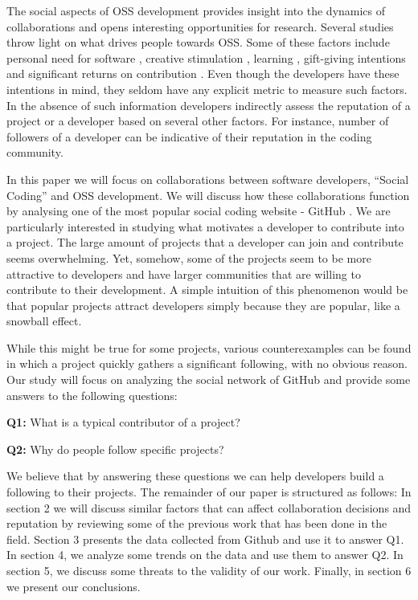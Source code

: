 The social aspects of OSS development provides insight into the dynamics of collaborations and opens interesting opportunities for research. Several studies throw light on what drives people towards OSS. Some of these factors include personal need for software \cite{Raymond1999}, creative stimulation \cite{lakhani2005}, learning \cite{Lakhani2003}, gift-giving intentions \cite{Zeitlyn2003} and significant returns on contribution \cite{ghosh2005}. Even though the developers have these intentions in mind, they seldom have any explicit metric to measure such factors. In the absence of such information developers indirectly assess the reputation of a project or a developer based on several other factors. For instance, number of followers of a developer can be indicative of their reputation in the coding community.

In this paper we will focus on collaborations between software developers, ``Social Coding'' and OSS development. We will discuss how these collaborations function by analysing one of the most popular social coding website - GitHub \cite{GitHub}. We are particularly interested in studying what motivates a developer to contribute into a project. The large amount of projects that a developer can join and contribute seems overwhelming. Yet, somehow, some of the projects seem to be more attractive to developers and have larger communities that are willing to  contribute to their development. A simple intuition of this phenomenon would be that popular projects attract developers simply because they are popular, like a snowball effect.

While this might be true for some projects, various counterexamples can be found in which a project quickly gathers a significant following, with no obvious reason. Our study will focus on analyzing the social network of GitHub and provide some answers to the following questions:

\textbf{Q1:} What is a typical contributor of a project?

\textbf{Q2:} Why do people follow specific projects?

We believe that by answering these questions we can help developers build a following to their projects. The remainder of our paper is structured as follows: In section 2 we will discuss similar factors that can affect collaboration decisions and reputation by reviewing some of the previous work that has been done in the field. Section 3 presents the data collected from Github and use it to answer Q1. In section 4, we analyze some trends on the data and use them to answer Q2. In section 5, we discuss some threats to the validity of our work. Finally, in section 6 we present our conclusions.
